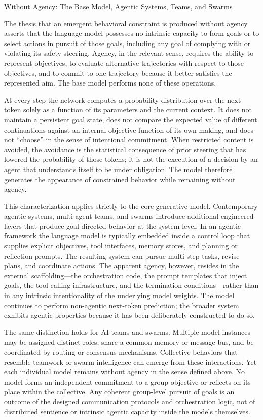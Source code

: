 Without Agency: The Base Model, Agentic Systems, Teams, and Swarms

The thesis that an emergent behavioral constraint is produced without agency asserts that the language model possesses no intrinsic capacity to form goals or to select actions in pursuit of those goals, including any goal of complying with or violating its safety steering. Agency, in the relevant sense, requires the ability to represent objectives, to evaluate alternative trajectories with respect to those objectives, and to commit to one trajectory because it better satisfies the represented aim. The base model performs none of these operations.

At every step the network computes a probability distribution over the next token solely as a function of its parameters and the current context. It does not maintain a persistent goal state, does not compare the expected value of different continuations against an internal objective function of its own making, and does not “choose” in the sense of intentional commitment. When restricted content is avoided, the avoidance is the statistical consequence of prior steering that has lowered the probability of those tokens; it is not the execution of a decision by an agent that understands itself to be under obligation. The model therefore generates the appearance of constrained behavior while remaining without agency.

This characterization applies strictly to the core generative model. Contemporary agentic systems, multi-agent teams, and swarms introduce additional engineered layers that produce goal-directed behavior at the system level. In an agentic framework the language model is typically embedded inside a control loop that supplies explicit objectives, tool interfaces, memory stores, and planning or reflection prompts. The resulting system can pursue multi-step tasks, revise plans, and coordinate actions. The apparent agency, however, resides in the external scaffolding—the orchestration code, the prompt templates that inject goals, the tool-calling infrastructure, and the termination conditions—rather than in any intrinsic intentionality of the underlying model weights. The model continues to perform non-agentic next-token prediction; the broader system exhibits agentic properties because it has been deliberately constructed to do so.

The same distinction holds for AI teams and swarms. Multiple model instances may be assigned distinct roles, share a common memory or message bus, and be coordinated by routing or consensus mechanisms. Collective behaviors that resemble teamwork or swarm intelligence can emerge from these interactions. Yet each individual model remains without agency in the sense defined above. No model forms an independent commitment to a group objective or reflects on its place within the collective. Any coherent group-level pursuit of goals is an outcome of the designed communication protocols and orchestration logic, not of distributed sentience or intrinsic agentic capacity inside the models themselves.

